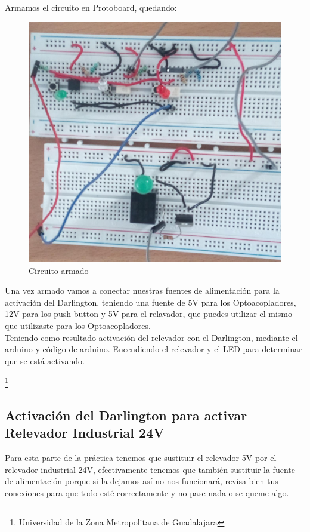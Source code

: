 \documentclass[10pt,a4paper]{article}
\begin{document}
Armamos el circuito en Protoboard, quedando:\\
\begin{figure}[hbtp]
\centering
\includegraphics[scale=0.12]{Pictures/Protoboard.jpeg}
\caption{Circuito armado}
\end{figure}

Una vez armado vamos a conectar nuestras fuentes de alimentación para la activación del Darlington, teniendo una fuente de 5V para los Optoacopladores, 12V para los push button y 5V para el relavador, que puedes utilizar el mismo que utilizaste para los Optoacopladores.\\
Teniendo como resultado activación del relevador con el Darlington, mediante el arduino y código de arduino. Encendiendo el relevador y el LED para determinar que se está activando. 

\footnote{Universidad de la Zona Metropolitana de Guadalajara}

\newpage
\subsection{Activación del Darlington para activar Relevador Industrial 24V}
Para esta parte de la práctica tenemos que sustituir el relevador 5V por el relevador industrial 24V, efectivamente tenemos que también sustituir la fuente de alimentación porque si la dejamos así no nos funcionará, revisa bien tus conexiones para que todo esté correctamente y no pase nada o se queme algo.\\
\end{document}
